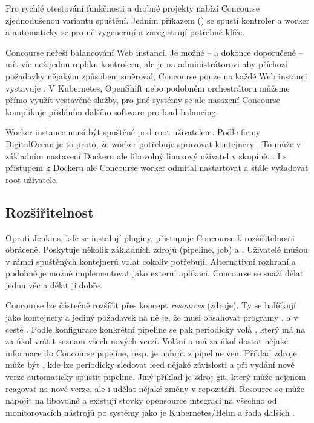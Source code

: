         Pro rychlé otestování funkčnosti a drobné projekty nabízí Concourse zjednodušenou variantu spuštění. Jedním příkazem () se spustí kontroler a worker a automaticky se pro ně vygenerují a zaregistrují potřebné klíče.

        Concourse neřeší balancování Web instancí. Je možné -- a dokonce doporučené -- mít víc než jednu repliku kontroleru, ale je na administrátorovi aby příchozí požadavky nějakým způsobem směroval, Concourse pouze na každé Web instanci vystavuje  . V Kubernetes, OpenShift nebo podobném orchestrátoru můžeme přímo využít vestavěné služby, pro jiné systémy se ale nasazení Concourse komplikuje přidáním dalšího software pro load balancing.

        Worker instance musí být spuštěné pod root uživatelem. Podle firmy DigitalOcean je to proto, že worker potřebuje spravovat kontejnery . To může v základním nastavení Dockeru ale libovolný linuxový uživatel v  skupině. . I s přístupem k Dockeru ale Concourse worker odmítal nastartovat a stále vyžadovat root uživatele.

    \subsection{Rozšiřitelnost}
        Oproti Jenkins, kde se instalují pluginy, přistupuje Concourse k rozšiřitelnosti obráceně. Poskytuje několik základních zdrojů (pipeline, job) a . Uživatelé můžou v rámci spuštěných kontejnerů volat cokoliv potřebují. Alternativní rozhraní a podobně je možné implementovat jako externí aplikaci. Concourse se snaží dělat jednu věc a dělat jí dobře.

        Concourse lze částečně rozšířit přes koncept \textit{resources} (zdroje). Ty se balíčkují jako kontejnery a jediný požadavek na ně je, že musí obsahovat programy ,  a  v cestě  \cite{concourse-resource}. Podle konfigurace konkrétní pipeline se pak periodicky volá , který má na za úkol vrátit seznam všech nových verzí. Volání  a  má za úkol dostat nějaké informace do Concourse pipeline, resp. je nahrát z pipeline ven. Příklad zdroje může být , kde lze periodicky sledovat feed nějaké závislosti a při vydání nové verze automaticky spustit pipeline. Jiný příklad je zdroj git, který může nejenom reagovat na nové verze, ale i udělat nějaké změny v repozitáři. Resource se může napojit na libovolné  a existují stovky opensource integrací na všechno od monitorovacích nástrojů po \CD systémy jako je Kubernetes/Helm a řada dalších \cite{concourse-resource-list}.


